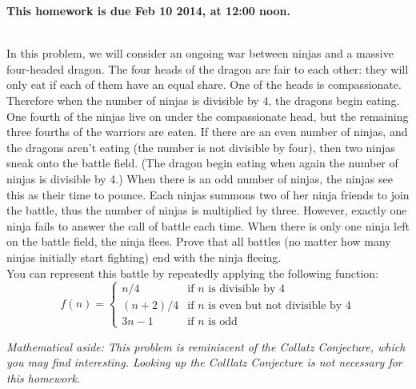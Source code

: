 \documentclass[11pt]{article}
\newif\ifsolutions
\begin{document}
\maketitle

\vspace{0.5em}
{\Large{\textbf{This homework is due Feb 10 2014, at 12:00 noon.}}}


\begin{qunlist}

 \\ 
In this problem, we will consider an ongoing war between ninjas and a massive four-headed dragon. 
The four heads of the dragon are fair to each other: 
they will only eat if each of them have an equal share. One of the heads is compassionate. 
Therefore when the number of ninjas is divisible by 4, the dragons begin eating.  
One fourth of the ninjas live on under the compassionate head, 
but the remaining three fourths of the warriors are eaten. 
If there are an even number of ninjas, and the dragons aren't eating 
(the number is not divisible by four), then two ninjas sneak onto the battle field. 
(The dragon begin eating when again the number of ninjas is divisible by 4.)
When there is an odd number of ninjas, the ninjas see this as their time to pounce. 
Each ninjas summons two of her ninja friends to join the battle, 
thus the number of ninjas is multiplied by three. 
However, exactly one ninja fails to answer the call of battle each time. 
When there is only one ninja left on the battle field, the ninja flees. 
Prove that all battles (no matter how many ninjas initially start fighting) 
end with the ninja fleeing. \\
You can represent this battle by repeatedly applying the following function:
\[ f(n) = \left\{ 
    \begin{array}{cl} 
        n/4 & \text{if $n$ is divisible by 4} \\
        (n+2)/4 & \text{if $n$ is even but not divisible by 4} \\
        3n - 1 & \text{if $n$ is odd} 
    \end{array} 
\right. \]

\textit{Mathematical aside: This problem is reminiscent of the Collatz Conjecture, which you may find interesting. Looking up the Colllatz Conjecture is not necessary for this homework.}

\ifsolutions
\textbf{Solutions:}
You can always get to 1. We can prove this by strong induction. 
If $n=1$, we are done.  If $n=2$, we add 2 and divide by 4, and then we are done.  
For our inductive hypothesis, we assume we can get to 1 from any number less than $n$. 
Then if $n$ is dividible by 4, dividing $n$ by 4 reduces the problem to one we have already solved.  
If $n$ is divisible by 2 but not 4, $(n+2)/4 < n$, 
so we've again reduced the problem to one we have already solved. \\
So the remaining case is if $n$ is odd. In this case, $3n-1$ will be even, so then we would either divide by 4, 
or add 2 and divide by 4, in either case $(3n-1)/4$ and $(3n+1)/4$ are both less than $n$ if $n \geq 2$.
\fi



\end{qunlist}
\end{document}
